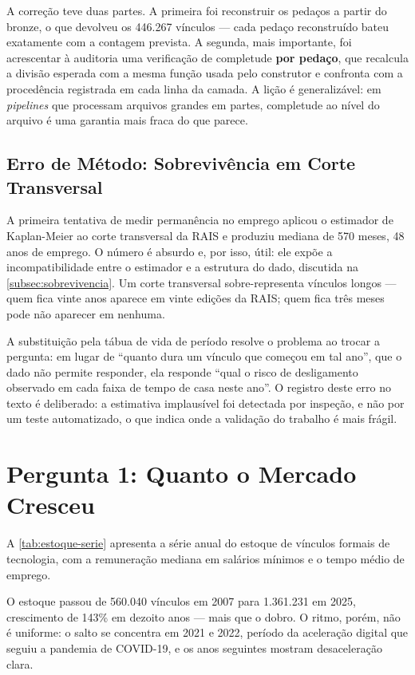 A correção teve duas partes. A primeira foi reconstruir os pedaços a partir do bronze, o que devolveu os 446.267 vínculos --- cada pedaço reconstruído bateu exatamente com a contagem prevista. A segunda, mais importante, foi acrescentar à auditoria uma verificação de completude \textbf{por pedaço}, que recalcula a divisão esperada com a mesma função usada pelo construtor e confronta com a procedência registrada em cada linha da camada. A lição é generalizável: em \textit{pipelines} que processam arquivos grandes em partes, completude ao nível do arquivo é uma garantia mais fraca do que parece.

\subsection{Erro de Método: Sobrevivência em Corte Transversal}

A primeira tentativa de medir permanência no emprego aplicou o estimador de Kaplan-Meier ao corte transversal da RAIS e produziu mediana de 570 meses, 48 anos de emprego. O número é absurdo e, por isso, útil: ele expõe a incompatibilidade entre o estimador e a estrutura do dado, discutida na \autoref{subsec:sobrevivencia}. Um corte transversal sobre-representa vínculos longos --- quem fica vinte anos aparece em vinte edições da RAIS; quem fica três meses pode não aparecer em nenhuma.

A substituição pela tábua de vida de período resolve o problema ao trocar a pergunta: em lugar de ``quanto dura um vínculo que começou em tal ano'', que o dado não permite responder, ela responde ``qual o risco de desligamento observado em cada faixa de tempo de casa neste ano''. O registro deste erro no texto é deliberado: a estimativa implausível foi detectada por inspeção, e não por um teste automatizado, o que indica onde a validação do trabalho é mais frágil.

\section{Pergunta 1: Quanto o Mercado Cresceu}
\label{sec:resultado-q1}

A \autoref{tab:estoque-serie} apresenta a série anual do estoque de vínculos formais de tecnologia, com a remuneração mediana em salários mínimos e o tempo médio de emprego.



O estoque passou de 560.040 vínculos em 2007 para 1.361.231 em 2025, crescimento de 143\% em dezoito anos --- mais que o dobro. O ritmo, porém, não é uniforme: o salto se concentra em 2021 e 2022, período da aceleração digital que seguiu a pandemia de COVID-19, e os anos seguintes mostram desaceleração clara.

